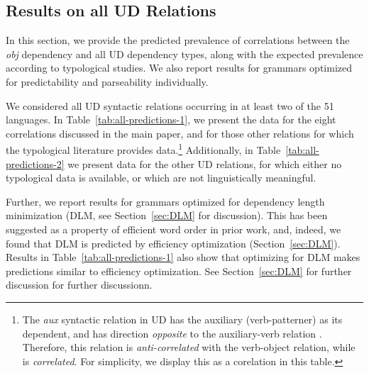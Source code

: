 \documentclass[10pt,twoside,lineno]{article}
\begin{document}
\subsection{Results on all UD Relations}
In this section, we provide the predicted prevalence of correlations between the \emph{obj} dependency and all UD dependency types, along with the expected prevalence according to typological studies.
We also report results for grammars optimized for predictability and parseability individually.


We considered all UD syntactic relations occurring in at least two of the 51 languages.
In Table~\ref{tab:all-predictions-1}, we present the data for the eight correlations discussed in the main paper, and for those other relations for which the typological literature provides data.\footnote{The \emph{aux} syntactic relation in UD has the auxiliary (verb-patterner) as its dependent, and has direction \emph{opposite} to the auxiliary-verb relation . Therefore, this relation is \emph{anti-correlated} with the verb-object relation, while  is \emph{correlated}.  For simplicity, we display this as a corelation in this table.}
Additionally, in Table~\ref{tab:all-predictions-2} we present data for the other UD relations, for which either no typological data is available, or which are not linguistically meaningful.




Further, we report results for grammars optimized for dependency length minimization (DLM, see Section~\ref{sec:DLM} for discussion).
This has been suggested as a property of efficient word order in prior work, and, indeed, we found that DLM is predicted by efficiency optimization (Section~\ref{sec:DLM}).
Results in Table~\ref{tab:all-predictions-1} also show that optimizing for DLM makes predictions similar to efficiency optimization. See Section~\ref{sec:DLM} for further discussion for further discussionn.
\end{document}
